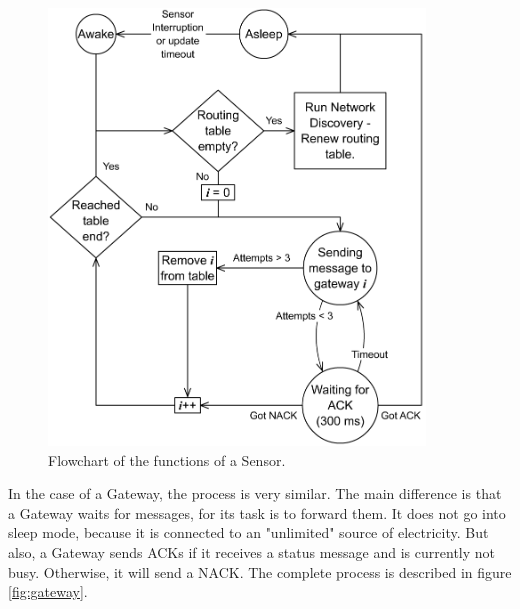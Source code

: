 \begin{figure}
    \centering
    \includegraphics[width=10cm]{images/Flowchart_Mote.png}
	\vspace{-1.5em}
    \caption{Flowchart of the functions of a Sensor.}
    \vspace{-1.5em}
    \label{fig:sensor}
\end{figure}

In the case of a Gateway, the process is very similar. 
The main difference is that a Gateway waits for messages, for its task is to forward them.
It does not go into sleep mode, because it is connected to an "unlimited" source of electricity.
But also, a Gateway sends ACKs if it receives a status message and is currently not busy.
Otherwise, it will send a NACK. The complete process is described in figure \ref{fig:gateway}.

